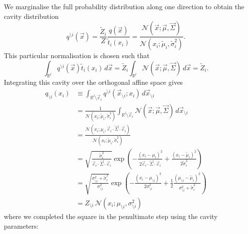 \documentclass[11pt,twoside]{report}
\begin{document}
We marginalise the full probability distribution along one direction to obtain the cavity distribution
\begin{equation}
  q^{\setminus i}(\vec{x}) =
  \frac{\tilde{Z}_i}{Z} \frac{q(\vec{x})}{\tilde{t}_i(x_i)}
  =
  \frac
      {\mathcal{N}(\vec{x}; \vec{\mu}, \vec{\Sigma})}
      {\mathcal{N}(x_i; \tilde{\mu}_i, \tilde{\sigma}_i^2)}.
\end{equation}
This particular normalisation is chosen such that
\begin{equation}\label{eq:approximate-zeroth-moment}
  \int_{\mathbb{R}^l} q^{\setminus i}(\vec{x}) \tilde{t}_i(x_i) \, d\vec{x} =
  \tilde{Z}_i \int_{\mathbb{R}^l} \mathcal{N}(\vec{x}; \vec{\mu}, \vec{\Sigma}) \, d\vec{x} =
  \tilde{Z}_i.
\end{equation}
Integrating this cavity over the orthogonal affine space gives
\begin{equation}
  \begin{split}
    q_{\setminus i}(x_i) &\equiv
    \int_{\mathbb{R}^l \setminus \vec{c}_i} q^{\setminus i} (\vec{x}_{\setminus i}; x_i) \, d\vec{x}_{\setminus i} \\
    &= \frac{1}{\mathcal{N}(x_i; \tilde{\mu}_i, \tilde{\sigma}_i^2)}
    \int_{\mathbb{R}^l \setminus \vec{c}_i} \mathcal{N}(\vec{x}; \vec{\mu}, \vec{\Sigma}) \, d\vec{x}_{\setminus i} \\
    &=
    \frac
        {\mathcal{N}(x_i; \mu_i, \vec{c}_i \cdot \vec{\Sigma} \cdot \vec{c}_i)}
        {\mathcal{N}(x_i; \tilde{\mu}_i, \tilde{\sigma}_i^2)} \\
    &=
        \sqrt{ \frac{\tilde{\sigma}_i^2}{\vec{c}_i \cdot \vec{\Sigma} \cdot \vec{c}_i} }
        \exp{\left( -\frac{(x_i - \mu_i)^2}{2 \vec{c}_i \cdot \vec{\Sigma} \cdot \vec{c}_i} +
          \frac{(x_i - \tilde{\mu}_i)^2}{2 \tilde{\sigma}_i^2} \right)} \\
    &=
        \sqrt{ \frac{\sigma_{\setminus i}^2 + \tilde{\sigma}_i^2}{\sigma_{\setminus i}^2} }
        \exp{\left(
          - \frac{(x_i - \mu_{\setminus i})^2}{2 \sigma_{\setminus i}^2}
          + \frac{1}{2}
          \frac{(\mu_{\setminus i} - \tilde{\mu}_i)^2}{\sigma_{\setminus i}^2 + \tilde{\sigma}_i^2}
          \right)} \\
     &= Z_{\setminus i} \, \mathcal{N}(x_i; \mu_{\setminus i}, \sigma_{\setminus i}^2)
  \end{split}
\end{equation}
where we completed the square in the penultimate step using the cavity parameters: \cite{Rasmussen2006,Cunningham2011}
\end{document}
